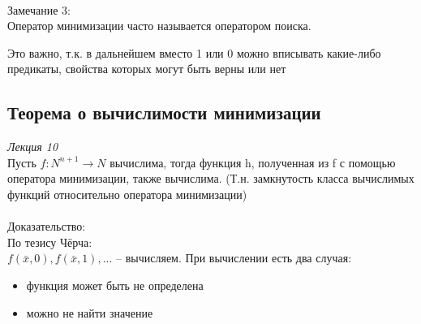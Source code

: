         \\Замечание 3:\\
        Оператор минимизации часто называется оператором поиска.
        
        Это важно, т.к. в дальнейшем вместо 1 или 0 можно вписывать какие-либо предикаты, свойства которых могут быть верны или нет
    
    \subsection{Теорема о вычислимости минимизации}
    \emph{Лекция 10}\\
        
        Пусть $f: N^{n + 1} \rightarrow N$ вычислима, тогда функция h, полученная из f с помощью оператора минимизации, также вычислима. (Т.н. замкнутость класса вычислимых функций относительно оператора минимизации)\\
        \\Доказательство:\\
        По тезису Чёрча:\\
        $f(\bar x, 0), f(\bar x, 1), ... $ -- вычисляем. При вычислении есть два случая:
        \begin{itemize}
            \item функция может быть не определена
            \item можно не найти значение
        \end{itemize}
        

